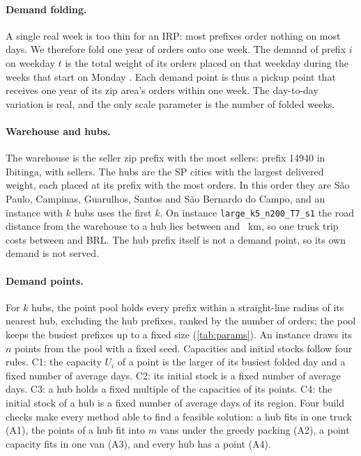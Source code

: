 \documentclass[11pt,a4paper]{article}
\begin{document}
\paragraph{Demand folding.}
A single real week is too thin for an IRP: most prefixes order nothing on most days. We therefore
fold one year of orders onto one week. The demand of prefix $i$ on weekday $t$ is the total weight of
its orders placed on that weekday during the \foldWeeks{} weeks that start on Monday \foldStart{}.
Each demand point is thus a pickup point that receives one year of its zip area's orders
within one week. The day-to-day variation is real, and the only scale parameter is the
number of folded weeks.

\paragraph{Warehouse and hubs.}
The warehouse is the seller zip prefix with the most sellers: prefix 14940 in Ibitinga, with
\warehouseSellers{} sellers. The hubs are the SP cities with the largest delivered weight, each
placed at its prefix with the most orders. In this order they are S\~ao Paulo, Campinas, Guarulhos, Santos and S\~ao Bernardo do
Campo, and an instance with $k$ hubs uses the first $k$. On instance
\texttt{large\_k5\_n200\_T7\_s1} the road distance from the warehouse to a hub lies between
\hubKmMin{} and \hubKmMax{}~km, so one truck trip costs between \tripCostMin{} and
\tripCostMax{} BRL. The hub prefix itself is not a demand point, so its own demand is not served.

\paragraph{Demand points.}
For $k$ hubs, the point pool holds every prefix within a straight-line radius of its nearest hub,
excluding the hub prefixes, ranked by the number of orders; the pool keeps the busiest prefixes up
to a fixed size (\cref{tab:params}). An instance draws its $n$ points from the pool with a fixed
seed. Capacities and initial stocks follow four rules. C1: the capacity $U_i$ of a point is the
larger of its busiest folded day and a fixed number of average days. C2: its initial stock is a
fixed number of average days. C3: a hub holds a fixed multiple of the capacities of its points. C4:
the initial stock of a hub is a fixed number of average days of its region. Four build checks make every method able to find a feasible solution: a hub fits in one truck
(A1), the points of a hub fit into $m$ vans under the greedy packing (A2), a point capacity fits
in one van (A3), and every hub has a point (A4).
\end{document}
